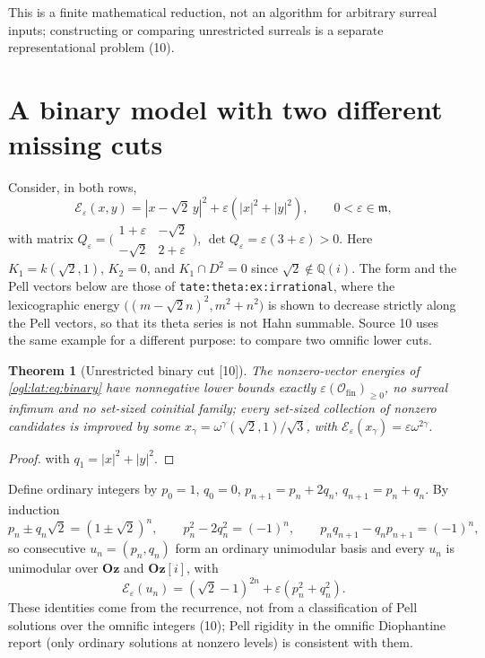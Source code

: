 \documentclass[11pt,oneside]{article}
\numberwithin{equation}{section}
\newtheorem{theorem}{Theorem}[section]
\theoremstyle{definition}
\theoremstyle{remark}
\newcommand{\Oz}{\mathbf{Oz}}
\newcommand{\GOz}{\mathbf{Oz}[i]}
\newcommand{\Q}{\mathbb Q}
\newcommand{\cE}{\mathcal E}
\newcommand{\Ofin}{\mathcal O_{\mathrm{fin}}}
\newcommand{\mm}{\mathfrak m}
\newcommand{\src}[1]{\textup{\textsf{\small[#1]}}}
\newcommand{\replabel}[1]{\nolinkurl{#1}}
\begin{document}
This is a finite mathematical reduction, not an algorithm for arbitrary surreal
inputs; constructing or comparing unrestricted surreals is a separate
representational problem (10).

\section{A binary model with two different missing cuts}\label{ogl:lat:sec:pell}

Consider, in both rows,
\begin{equation}\label{ogl:lat:eq:binary}
 \cE_\varepsilon(x,y)=|x-\sqrt2\,y|^2+\varepsilon(|x|^2+|y|^2),\qquad
 0<\varepsilon\in\mm,
\end{equation}
with matrix
$Q_\varepsilon=\bigl(\begin{smallmatrix}1+\varepsilon&-\sqrt2\\-\sqrt2&2+\varepsilon\end{smallmatrix}\bigr)$,
$\det Q_\varepsilon=\varepsilon(3+\varepsilon)>0$. Here $K_1=k(\sqrt2,1)$, $K_2=0$,
and $K_1\cap D^2=0$ since $\sqrt2\notin\Q(i)$. The form and the Pell vectors
below are those of \replabel{tate:theta:ex:irrational}, where the lexicographic
energy $\bigl((m-\sqrt2n)^2,m^2+n^2\bigr)$ is shown to decrease strictly along the
Pell vectors, so that its theta series is not Hahn summable. Source 10 uses the
same example for a different purpose: to compare two omnific lower cuts.

\begin{theorem}[Unrestricted binary cut \src{10}]\label{ogl:lat:thm:binarycut}
The nonzero-vector energies of \eqref{ogl:lat:eq:binary} have nonnegative lower
bounds exactly $\varepsilon(\Ofin)_{\ge0}$, no surreal infimum and no set-sized
coinitial family; every set-sized collection of nonzero candidates is improved by
some $x_\gamma=\omega^\gamma(\sqrt2,1)/\sqrt3$, with
$\cE_\varepsilon(x_\gamma)=\varepsilon\omega^{2\gamma}$.
\end{theorem}
\begin{proof}
 with $q_1=|x|^2+|y|^2$.
\end{proof}

Define ordinary integers by $p_0=1$, $q_0=0$, $p_{n+1}=p_n+2q_n$,
$q_{n+1}=p_n+q_n$. By induction
\begin{equation}\label{ogl:lat:eq:pell}
 p_n\pm q_n\sqrt2=(1\pm\sqrt2)^n,\qquad p_n^2-2q_n^2=(-1)^n,\qquad
 p_nq_{n+1}-q_np_{n+1}=(-1)^n ,
\end{equation}
so consecutive $u_n=(p_n,q_n)$ form an ordinary unimodular basis and every $u_n$
is unimodular over $\Oz$ and $\GOz$, with
\begin{equation}\label{ogl:lat:eq:pellenergy}
 \cE_\varepsilon(u_n)=(\sqrt2-1)^{2n}+\varepsilon(p_n^2+q_n^2).
\end{equation}
These identities come from the recurrence, not from a classification of Pell
solutions over the omnific integers (10); Pell rigidity in the omnific
Diophantine report (only ordinary solutions at nonzero levels) is consistent
with them.
\end{document}
